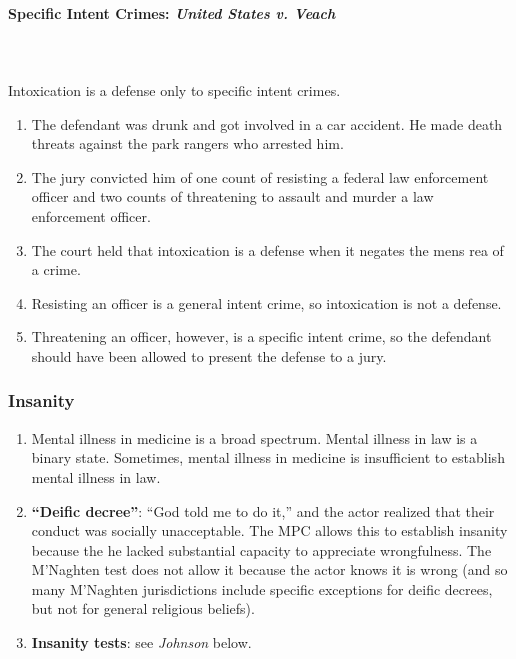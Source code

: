 \paragraph{Specific Intent Crimes: \emph{United States v. Veach}}
~\\\\
Intoxication is a defense only to specific intent crimes.

\begin{enumerate}
    \item The defendant was drunk and got involved in a car accident. He made 
    death threats against the park rangers who arrested him.
    \item The jury convicted him of one count of resisting a federal law 
    enforcement officer and two counts of threatening to assault and murder a 
    law enforcement officer.
    \item The court held that intoxication is a defense when it negates the 
    mens rea of a crime.
    \item Resisting an officer is a general intent crime, so intoxication is 
    not a defense.
    \item Threatening an officer, however, is a specific intent crime, so the 
    defendant should have been allowed to present the defense to a jury.
\end{enumerate}

\subsubsection{Insanity}

\begin{enumerate}
    \item Mental illness in medicine is a broad spectrum. Mental illness in 
    law is a binary state. Sometimes, mental illness in medicine is 
    insufficient to establish mental illness in law.
    \item \textbf{``Deific decree''}: ``God told me to do it,'' and the actor 
    realized that their conduct was socially unacceptable. The MPC allows 
    this to establish insanity because the he lacked substantial capacity to 
    appreciate wrongfulness. The M'Naghten test does not allow it because the 
    actor knows it is wrong (and so many M'Naghten jurisdictions include 
    specific exceptions for deific decrees, but not for general religious 
    beliefs).
    \item \textbf{Insanity tests}: see \emph{Johnson} below.
\end{enumerate}


